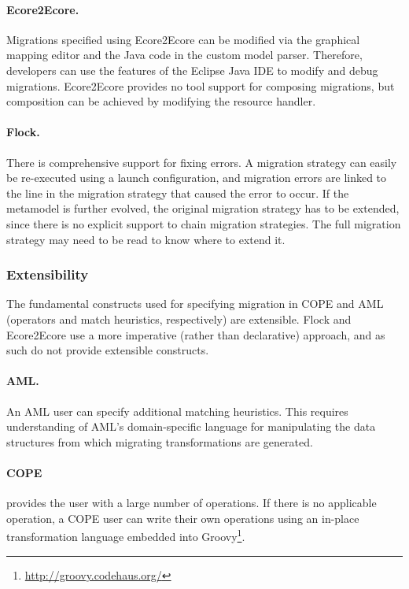 \paragraph{Ecore2Ecore.} Migrations specified using Ecore2Ecore can be modified via the graphical mapping editor and the Java code in the custom model parser. Therefore, developers can use the features of the Eclipse Java IDE to modify and debug migrations. Ecore2Ecore provides no tool support for composing migrations, but composition can be achieved by modifying the resource handler.

\paragraph{Flock.} There is comprehensive support for fixing errors. A migration strategy can easily be re-executed using a launch configuration, and migration errors are linked to the line in the migration strategy that caused the error to occur. If the metamodel is further evolved, the original migration strategy has to be extended, since there is no explicit support to chain migration strategies. The full migration strategy may need to be read to know where to extend it.


\subsubsection{Extensibility}
The fundamental constructs used for specifying migration in COPE and AML (operators and match heuristics, respectively) are extensible. Flock and Ecore2E\-core use a more imperative (rather than declarative) approach, and as such do not provide extensible constructs.

\paragraph{AML.} An AML user can specify additional matching heuristics. This requires understanding of AML's domain-specific language for manipulating the data structures from which migrating transformations are generated.

\paragraph{COPE} provides the user with a large number of operations. If there is no applicable operation, a COPE user can write their own operations using an in-place transformation language embedded into Groovy\footnote{\url{http://groovy.codehaus.org/}}.


